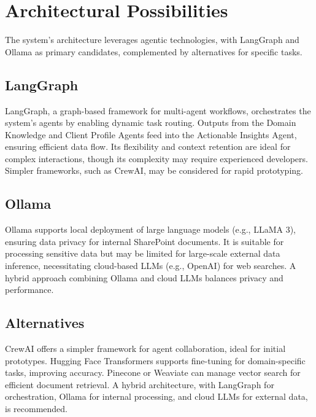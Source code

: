 \documentclass{article}
\begin{document}
\section{Architectural Possibilities}
The system’s architecture leverages agentic technologies, with LangGraph and Ollama as primary candidates, complemented by alternatives for specific tasks.

\subsection{LangGraph}
LangGraph, a graph-based framework for multi-agent workflows, orchestrates the system’s agents by enabling dynamic task routing. Outputs from the Domain Knowledge and Client Profile Agents feed into the Actionable Insights Agent, ensuring efficient data flow. Its flexibility and context retention are ideal for complex interactions, though its complexity may require experienced developers. Simpler frameworks, such as CrewAI, may be considered for rapid prototyping.

\subsection{Ollama}
Ollama supports local deployment of large language models (e.g., LLaMA 3), ensuring data privacy for internal SharePoint documents. It is suitable for processing sensitive data but may be limited for large-scale external data inference, necessitating cloud-based LLMs (e.g., OpenAI) for web searches. A hybrid approach combining Ollama and cloud LLMs balances privacy and performance.

\subsection{Alternatives}
CrewAI offers a simpler framework for agent collaboration, ideal for initial prototypes. Hugging Face Transformers supports fine-tuning for domain-specific tasks, improving accuracy. Pinecone or Weaviate can manage vector search for efficient document retrieval. A hybrid architecture, with LangGraph for orchestration, Ollama for internal processing, and cloud LLMs for external data, is recommended.

\end{document}
